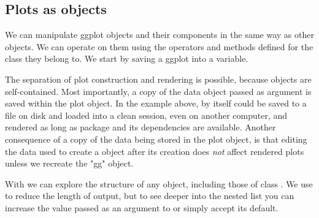 \documentclass[krantz2]{krantz}\usepackage{knitr}
\begin{document}
\subsection{Plots as \Rlang objects}
We can manipulate ggplot objects and their components in the same way as other \Rlang objects. We can operate on them using the operators and methods defined for the  class they belong to. We start by saving a ggplot into a variable.

\begin{knitrout}\footnotesize
{}\color{fgcolor}\begin{kframe}
\begin{alltt}
 \hlkwb{<-} \hlstd{(} 
       \hlstd{(}    \hlopt{+}
  \hlstd{()}
\end{alltt}
\end{kframe}
\end{knitrout}

\begin{warningbox}
  The separation of plot construction and rendering is possible, because  objects are self-contained. Most importantly, a copy of the data object passed as argument is saved within the plot object. In the example above,  by itself could be saved to a file on disk and loaded into a clean \Rlang session, even on another computer, and rendered as long as package \ggplot and its dependencies are available. Another consequence of a copy of the data being stored in the plot object, is that editing the data used to create a  object after its creation does \emph{not} affect rendered plots unless we recreate the "gg" object.

  With  we can explore the structure of any \Rlang object, including those of class . We use  to reduce the length of output, but to see deeper into the nested list you can increase the value passed as an argument to  or simply accept its default.

\begin{knitrout}\footnotesize
{}\color{fgcolor}\begin{kframe}
\begin{alltt}
  \hlstd{=} \hlstd{)}
\end{alltt}
\end{kframe}
\end{knitrout}
\end{warningbox}
\end{document}
